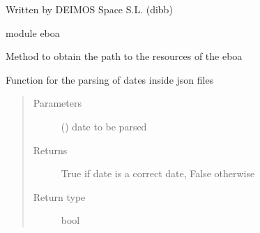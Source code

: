Written by DEIMOS Space S.L. (dibb)

module eboa

\begin{fulllineitems}
\label{\detokenize{eboa.engine:eboa.engine.functions.get_resources_path}}
Method to obtain the path to the resources of the eboa

\end{fulllineitems}


\begin{fulllineitems}
\label{\detokenize{eboa.engine:eboa.engine.functions.is_datetime}}
Function for the parsing of dates inside json files
\begin{quote}\begin{description}
\item[{Parameters}] \leavevmode
{} () \textendash{} date to be parsed

\item[{Returns}] \leavevmode
True if date is a correct date, False otherwise

\item[{Return type}] \leavevmode
bool

\end{description}\end{quote}

\end{fulllineitems}


\begin{fulllineitems}
\label{\detokenize{eboa.engine:eboa.engine.functions.is_valid_date_filters}}
\end{fulllineitems}


